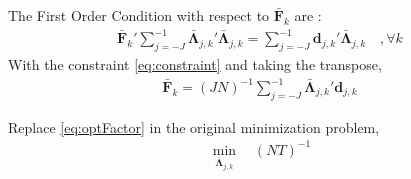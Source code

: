 \documentclass{article}
\numberwithin{equation}{section}
\let \oldsum \sum
\renewcommand{\sum}{\displaystyle \oldsum}
\newcommand{\scalesum}{\sum_{j=-J}^{-1}}
\newcommand{\coeffs}[2]{\bm{d}_{#1,#2}}
\newcommand{\optLoadings}[2]{\bar{\bm{\Lambda}}_{#1,#2}}
\newcommand{\optFactors}[1]{\bar{\bm{F}}_{#1}}
\begin{document}
	The First Order Condition with respect to $\optFactors{k}$ are :
	\begin{align*}
		\optFactors{k}' \scalesum \optLoadings{j}{k}' \optLoadings{j}{k} = \scalesum \coeffs{j}{k}' \optLoadings{j}{k} \quad, \forall k
	\end{align*}
	With the constraint \eqref{eq:constraint} and taking the transpose, 
	\begin{align}\label{eq:optFactor}
		\optFactors{k} = (JN)^{-1} \scalesum \optLoadings{j}{k}' \coeffs{j}{k}
	\end{align}

	Replace \eqref{eq:optFactor} in the original minimization problem, 
	\begin{align*}
		\min_{\optLoadings{j}{k}} \quad (NT)^{-1}
	\end{align*}

































	
\end{document}
